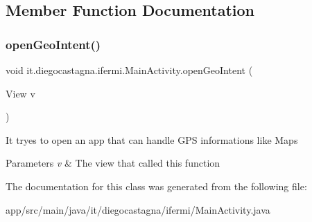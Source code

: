 \subsection{Member Function Documentation}
\mbox{\label{classit_1_1diegocastagna_1_1ifermi_1_1_main_activity_ae2ae327990e45705546cae9f17ead95b}} 
\subsubsection{\texorpdfstring{openGeoIntent()}{openGeoIntent()}}
{\footnotesize\ttfamily void it.\+diegocastagna.\+ifermi.\+Main\+Activity.\+open\+Geo\+Intent (\begin{DoxyParamCaption}\item[{View}]{v }\end{DoxyParamCaption})\hspace{0.3cm}{\ttfamily [inline]}}

It tryes to open an app that can handle G\+PS informations like Maps 
\begin{DoxyParams}{Parameters}
{\em v} & The view that called this function \\
\hline
\end{DoxyParams}


The documentation for this class was generated from the following file\+:\begin{DoxyCompactItemize}
\item 
app/src/main/java/it/diegocastagna/ifermi/Main\+Activity.\+java\end{DoxyCompactItemize}
